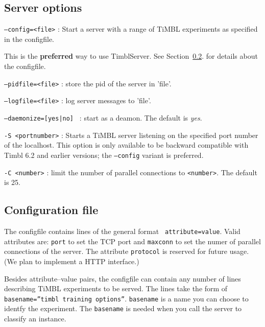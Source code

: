 \documentclass{report}
\begin{document}
\subsection{Server options}

\begin{description}

\item {\tt --config=<file>} : Start a server with a range of TiMBL experiments as specified in the configfile.

This is the {\bf preferred} way to use TimblServer. See Section~\ref{configfile}. for details about the configfile.

\item {\tt --pidfile=<file>} : store the pid of the server in 'file'.

\item {\tt --logfile=<file>} : log server messages to 'file'.
\item {\tt --daemonize=[yes|no] } : start as a deamon. The default is {\em yes}.

\item {\tt -S <portnumber>} : Starts a TiMBL server listening on the
  specified port number of the localhost.  This option is only
  available to be backward compatible with Timbl 6.2 and earlier
  versions; the {\tt --config} variant is preferred.
\item {\tt -C <number>} : limit the number of parallel connections to
  {\tt <number>}. The default is 25.

\end{description}

\subsection{Configuration file}
\label{configfile}

The configfile contains lines of the general format {\tt
  attribute=value}.  Valid attributes are: {\tt port} to set the TCP
port and {\tt maxconn} to set the numer of parallel connections of the
server. The attribute {\tt protocol} is reserved for future usage. (We
plan to implement a HTTP interface.)

Besides attribute--value pairs, the configfile can contain any
number of lines describing TiMBL experiments to be served. The lines
take the form of {\tt basename=''timbl training options''}.  {\tt basename}
is a name you can choose to identfy the experiment. The {\tt basename}
is needed when you call the server to classify an instance.
\end{document}

